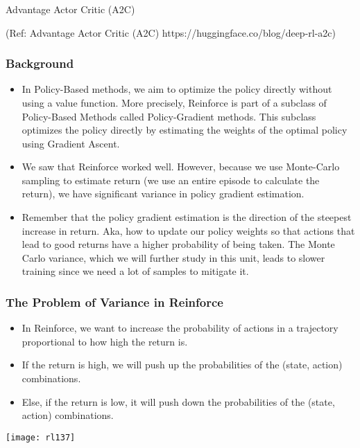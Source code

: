 \begin{frame}[fragile]\frametitle{}
\begin{center}
{\Large Advantage Actor Critic (A2C)}
\end{center}

{\tiny (Ref: Advantage Actor Critic (A2C)  https://huggingface.co/blog/deep-rl-a2c)}

\end{frame}

\begin{frame}[fragile]\frametitle{Background}


\begin{itemize}
\item In Policy-Based methods, we aim to optimize the policy directly without using a value function. More precisely, Reinforce is part of a subclass of Policy-Based Methods called Policy-Gradient methods. This subclass optimizes the policy directly by estimating the weights of the optimal policy using Gradient Ascent.
\item 
We saw that Reinforce worked well. However, because we use Monte-Carlo sampling to estimate return (we use an entire episode to calculate the return), we have significant variance in policy gradient estimation.
\item 
Remember that the policy gradient estimation is the direction of the steepest increase in return. Aka, how to update our policy weights so that actions that lead to good returns have a higher probability of being taken. The Monte Carlo variance, which we will further study in this unit, leads to slower training since we need a lot of samples to mitigate it.
\end{itemize}


\end{frame}

\begin{frame}[fragile]\frametitle{The Problem of Variance in Reinforce}


\begin{itemize}
\item In Reinforce, we want to increase the probability of actions in a trajectory proportional to how high the return is.
\item If the return is high, we will push up the probabilities of the (state, action) combinations.
\item Else, if the return is low, it will push down the probabilities of the (state, action) combinations.
\end{itemize}

\begin{center}
\texttt{[image: rl137]}
\end{center}

\end{frame}

